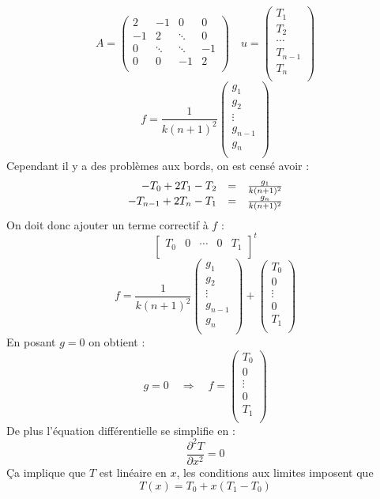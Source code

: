 \documentclass{article}
\begin{document}
\[
	A = 
	\begin{pmatrix}
	2	& 	-1	&	0	& 0	\\
	-1	&	2	&\ddots	& 0	\\
	0	& \ddots&\ddots	&-1	\\
	0	& 	0	& -1 	& 2	\\
	\end{pmatrix}
	\quad u = 
	\begin{pmatrix}
		T_1 \\ T_2 \\ \cdots \\ T_{n-1} \\ T_n \\
	\end{pmatrix}
\]
\[
	f = \frac{1}{k(n+1)^2}
	\begin{pmatrix}
		g_1 \\ g_2 \\ \vdots \\ g_{n-1} \\ g_n \\
	\end{pmatrix}
\]
Cependant il y a des problèmes aux bords, on est censé avoir :
\[
	\begin{array}{r c l}
		-T_0 + 2T_1 - T_2 & = & \frac{g_1}{k(n+1)^2}\\
		-T_{n-1} + 2T_n - T_1 & = & \frac{g_n}{k(n+1)^2}\\
	\end{array}
\]
On doit donc ajouter un terme correctif à $f$ :
\[
	\begin{bmatrix}
		T_0 & 0 & \cdots & 0 & T_1 \\
	\end{bmatrix}^t
\]
\[
	f = \frac{1}{k(n+1)^2}
	\begin{pmatrix}
		g_1 \\ g_2 \\ \vdots \\ g_{n-1} \\ g_n \\
	\end{pmatrix} 
	+ \begin{pmatrix}
		T_0 \\ 0 \\ \vdots \\ 0 \\ T_1 \\
	\end{pmatrix}
\]
En posant $g=0$ on obtient :
\[
	g = 0 \quad	\Longrightarrow \quad 
	f = \begin{pmatrix}
		T_0 \\ 0 \\ \vdots \\ 0 \\ T_1 \\
	\end{pmatrix}
\]
De plus l'équation différentielle se simplifie en :
\[
	\frac{\partial^2 T}{\partial x^2} = 0
\]
Ça implique que $T$ est linéaire en $x$, les conditions aux limites imposent que 
\[
	T(x) = T_0 + x(T_1 - T_0)
\]
\end{document}
